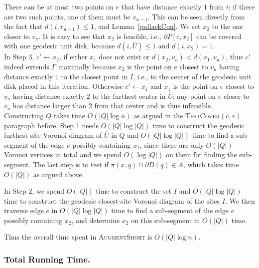 \documentclass{llncs}
\begin{document}
There can be at most two points on $e$ that have distance exactly $1$ from $i$; if there are two such points, one of them must be $v_{u-1}$.  This can be seen directly from the fact that $d(i, v_{u-1}) \leq 1$, and Lemma~\ref{pollackCon}.  We set $x_2$ to the one closer to $v_u$. It is easy to see that $x_2$ is feasible, i.e., $\partial P[c,x_2]$ can be covered with one geodesic unit disk, because $d(i, \overline{U}) \leq 1$ and $d(i,x_2)=1$.\\

In Step 3, $c' \gets x_2$, if either $x_1$ does not exist or $d(x_2,v_u) < d(x_1,v_u)$, thus  $c'$ indeed extends $\Gamma$ maximally because $x_2$ is the point on $e$ closest to $v_u$ having distance exactly $1$ to the closest point in $I$, i.e., to the center of the geodesic unit disk placed in this iteration. Otherwise $c' \gets x_1$ and $x_1$ is the point on $e$ closest to $v_u$ having distance exactly $2$ to the furthest center in $\overline{U}$; any point on $e$ closer to $v_u$ has distance larger than $2$ from that center and is thus infeasible.\\


Constructing $Q$ takes time $O(|Q| \log n)$ as argued in the \textsc{TestCover}$(c, v)$ paragraph before.
Step 1 needs $O(|Q| \log |Q|)$ time to construct the geodesic furthest-site Voronoi diagram of $\overline{U}$ in $Q$ and $O(|Q| \log |Q|)$  time to find a sub-segment of the edge $e$ possibly containing $x_1$, since there are only $O(|Q|)$ Voronoi vertices in total and we spend $O(\log |Q|)$ on them for finding the sub-segment. The last step is to test if $\pi(x,q) \cap \partial D(q) \in A$, which takes time $O(|Q|)$ as argued above.

In Step 2, we spend $O(|Q|)$ time to construct the set $I$ and $O(|Q| \log |Q|)$ time to construct the geodesic closest-site Voronoi diagram of the sites $I$. We then traverse edge $e$ in $O(|Q| \log |Q|)$ time to find a sub-segment of the edge $e$ possibly containing $x_2$, and determine $x_2$ on this sub-segment in $O(|Q|)$ time.

Thus the overall time spent in \textsc{AugmentShort}  is $O(|Q|\log n)$.

\subsubsection{Total Running Time.}
\end{document}
